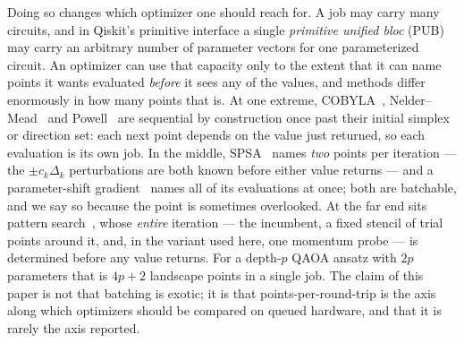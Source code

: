 \documentclass[aps,prx,preprint,superscriptaddress,nofootinbib,longbibliography]{revtex4-2}
\begin{document}
\label{sec:intro-batching}%
Doing so changes which optimizer one should reach for. A job may carry many circuits, and in
Qiskit's primitive interface a single \emph{primitive unified bloc} (PUB) may carry an
arbitrary number of parameter vectors for one parameterized circuit. An optimizer can use
that capacity only to the extent that it can name points it wants evaluated \emph{before} it
sees any of the values, and methods differ enormously in how many points that is. At one
extreme, COBYLA~\cite{powell1994cobyla}, Nelder--Mead~\cite{nelder1965simplex} and
Powell~\cite{powell1964efficient} are sequential by construction once past their initial simplex
or direction set: each next point depends on the value just returned, so each evaluation is its
own job. In the middle, SPSA~\cite{spall1992spsa} names \emph{two} points per iteration --- the
$\pm c_k\Delta_k$ perturbations are both known before either value returns --- and a
parameter-shift gradient~\cite{mitarai2018qcl,schuld2019gradients} names all of its evaluations
at once; both are batchable, and we say so because the point is sometimes overlooked. At the far
end sits pattern search~\cite{torczon1997convergence,kolda2003directsearch,hough2001apps}, whose
\emph{entire} iteration --- the incumbent, a fixed stencil of trial points around it, and, in the
variant used here, one momentum probe --- is determined before any value returns. For a depth-$p$
QAOA ansatz with $2p$ parameters that is $4p+2$ landscape points in a single job. The claim of
this paper is not that batching is exotic; it is that points-per-round-trip is the axis along
which optimizers should be compared on queued hardware, and that it is rarely the axis
reported.
\end{document}
